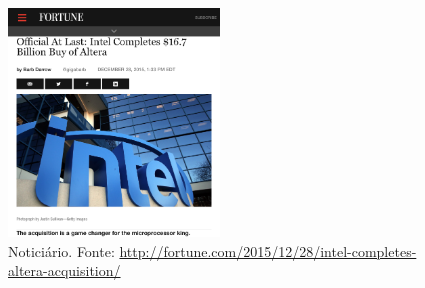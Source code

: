 \documentclass[aspectratio=169]{beamer}
\begin{document}
	\begin{frame}
		\begin{figure}[H]
			\centering
			\includegraphics[width=0.5\textwidth]{img/fpga/intel_altera_2.png}
			\protect\caption{Noticiário. Fonte: \url{http://fortune.com/2015/12/28/intel-completes-altera-acquisition/}}
			\label{fig:intel_altera_noticia}
		\end{figure}
	\end{frame}
	
\end{document}
